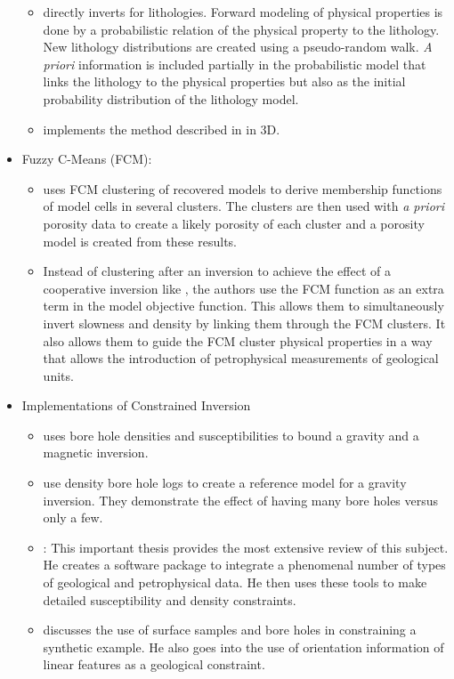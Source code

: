 \begin{itemize}
\begin{itemize}
\item \cite{bosch2001lithologic} directly inverts for lithologies. Forward modeling of physical properties is done by a probabilistic relation of the physical property to the lithology. New lithology distributions are created using a pseudo-random walk. \emph{A priori} information is included partially in the probabilistic model that links the lithology to the physical properties but also as the initial probability distribution of the lithology model.
\item \cite{guillen2008geological} implements the method described in \cite{bosch2001lithologic} in 3D.
\end{itemize}
\item Fuzzy C-Means (FCM): 
\begin{itemize}
	\item \cite{paasche2006integration} uses FCM clustering of recovered models to derive membership functions of model cells in several clusters. The clusters are then used with \emph{a priori} porosity data to create a likely porosity of each cluster and a porosity model is created from these results.
	\item \cite{sun2015multidomain} Instead of clustering after an inversion to achieve the effect of a cooperative inversion like \cite{paasche2006integration}, the authors use the FCM function as an extra term in the model objective function. This allows them to simultaneously invert slowness and density by linking them through the FCM clusters. It also allows them to guide the FCM cluster physical properties in a way that allows the introduction of petrophysical measurements of geological units.
\end{itemize}
\item Implementations of Constrained Inversion
\begin{itemize}
	\item \cite{phillips2001thesis} uses bore hole densities and susceptibilities to bound a gravity and a magnetic inversion.
	\item \cite{farquharson2008geologically} use density bore hole logs to create a reference model for a gravity inversion. They demonstrate  the effect of having many bore holes versus only a few.
	\item \cite{williams2008geologically}: This important thesis provides the most extensive review of this subject. He creates a software package to integrate a phenomenal number of types of geological and petrophysical data. He then uses these tools to make detailed susceptibility and density constraints.
	\item \cite{Lelievre2009Integrating} discusses the use of surface samples and bore holes in constraining a synthetic example. He also goes into the use of orientation information of linear features as a geological constraint.
	

\end{itemize}
\end{itemize}
